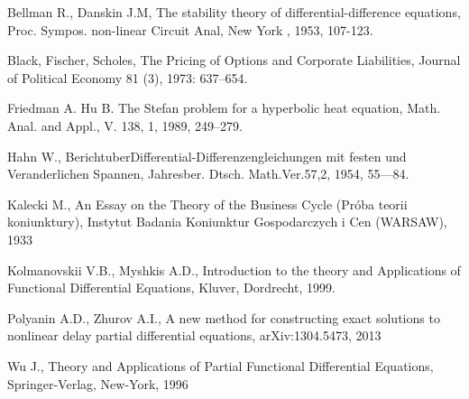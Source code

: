 \begin{thebibliography}{99}
Bellman R., Danskin J.M, The stability theory of differential-difference equations, Proc. Sympos. non-linear Circuit Anal, New York , 1953, 107-123.

Black, Fischer, Scholes, The Pricing of Options and Corporate Liabilities, Journal of Political Economy 81 (3), 1973: 637–654.

Friedman A. Hu B. The Stefan problem for a hyperbolic heat equation, Math. Anal. and Appl., V. 138, 1, 1989, 249–279.

Hahn W., BerichtuberDifferential-Differenzengleichungen mit festen und Veranderlichen Spannen, Jahresber. Dtsch. Math.Ver.57,2, 1954, 55—84.

Kalecki M., An Essay on the Theory of the Business Cycle (Próba teorii koniunktury), Instytut Badania Koniunktur Gospodarczych i Cen (WARSAW), 1933

Kolmanovskii V.B., Myshkis A.D., Introduction to the theory and Applications of Functional Differential Equations, Kluver, Dordrecht, 1999.

Polyanin A.D., Zhurov A.I., A new method for constructing exact solutions to nonlinear delay partial differential equations, arXiv:1304.5473, 2013

Wu J., Theory and Applications of Partial Functional Differential Equations, Springer-Verlag, New-York, 1996

\end{thebibliography}